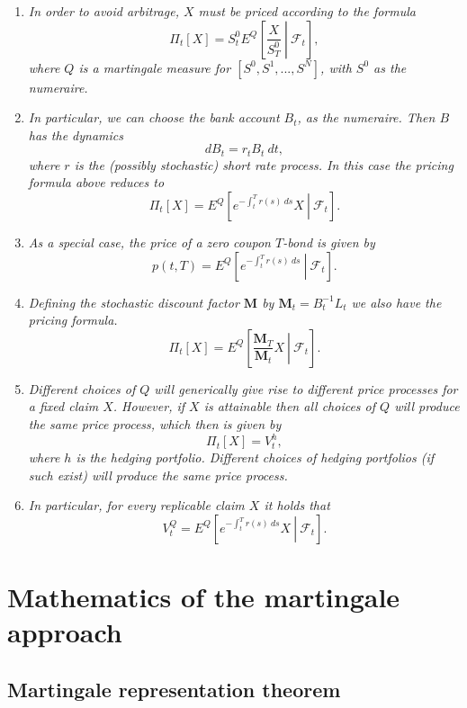 \documentclass[a4paper,12pt,openany]{book}
\providecommand{\tightlist}{%
 \setlength{\itemsep}{0pt}\setlength{\parskip}{0pt}}
\begin{document}
\begin{enumerate}
\def\labelenumi{\arabic{enumi}.}
\tightlist
\item
  \emph{In order to avoid arbitrage, \(X\) must be priced according to the formula}
  \[
    \Pi_t[X]=S^0_tE^Q\left[\left. \frac{X}{S^0_T}\ \right\vert\ \mathcal{F}_t\right],\tag{11.55}
    \]
  \emph{where \(Q\) is a martingale measure for \([S^0,S^1,...,S^N]\), with \(S^0\) as the numeraire.}
\item
  \emph{In particular, we can choose the bank account \(B_t\), as the numeraire. Then \(B\) has the dynamics}
  \[
    dB_t=r_tB_t\ dt,\tag{11.56}
    \]
  \emph{where \(r\) is the (possibly stochastic) short rate process. In this case the pricing formula above reduces to}
  \[
    \Pi_t[X]=E^Q\left[\left. e^{-\int_t^T r(s)\ ds}X\ \right\vert\ \mathcal{F}_t\right].\tag{11.57}
    \]
\item
  \emph{As a special case, the price of a zero coupon \(T\)-bond is given by}
  \[
    p(t,T)=E^Q\left[\left. e^{-\int_t^T r(s)\ ds}\ \right\vert\ \mathcal{F}_t\right].\tag{11.58}
    \]
\item
  \emph{Defining the stochastic discount factor \(\mathbf{M}\) by \(\mathbf{M}_t=B_t^{-1}L_t\) we also have the pricing formula.}
  \[
    \Pi_t[X]=E^Q\left[\left. \frac{\mathbf{M}_T}{\mathbf{M}_t}X\ \right\vert\ \mathcal{F}_t\right].\tag{11.59}
    \]
\item
  \emph{Different choices of \(Q\) will generically give rise to different price processes for a fixed claim \(X\). However, if \(X\) is attainable then all choices of \(Q\) will produce the same price process, which then is given by}
  \[
    \Pi_t[X]=V_t^h,\tag{11.60}
    \]
  \emph{where \(h\) is the hedging portfolio. Different choices of hedging portfolios (if such exist) will produce the same price process.}
\item
  \emph{In particular, for every replicable claim \(X\) it holds that}
  \[
    V_t^Q=E^Q\left[\left. e^{-\int_t^T r(s)\ ds}X\ \right\vert\ \mathcal{F}_t\right].\tag{11.61}
    \]
\end{enumerate}

\hypertarget{mathematics-of-the-martingale-approach}{%
\section{Mathematics of the martingale approach}\label{mathematics-of-the-martingale-approach}}

\hypertarget{martingale-representation-theorem}{%
\subsection{Martingale representation theorem}\label{martingale-representation-theorem}}
\end{document}
